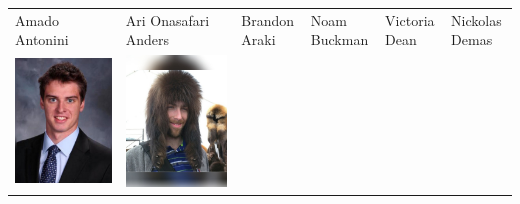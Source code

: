 \documentclass[landscape,a0paper,fontscale=0.292]{baposter}
\begin{document}
\begin{poster}
{\begin{center}
\begin{tabularx}{\linewidth}{X X X X X X}
{\tiny \centering Amado Antonini }& {\tiny \centering Ari Onasafari Anders }& {\tiny \centering Brandon Araki }& {\tiny \centering Noam Buckman }& {\tiny \centering Victoria Dean }& {\tiny \centering Nickolas Demas }\\ 
 {\centering \includegraphics[width=0.6\linewidth]{mfe.jpg}}&
{\centering \includegraphics[width=0.6\linewidth]{agirard.jpg}}&

\end{tabularx}
\end{center}}
\end{poster}
\end{document}
